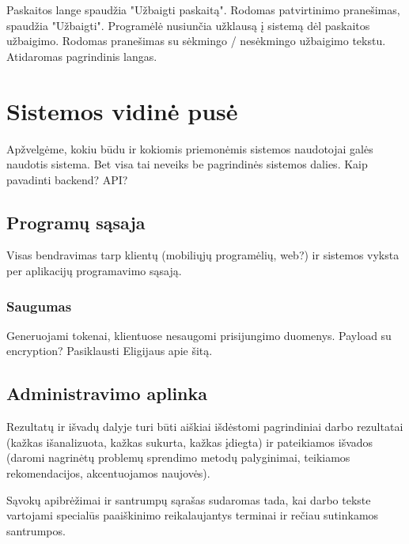 \documentclass{VUMIFPSkursinis}
\begin{document}
Paskaitos lange spaudžia "Užbaigti paskaitą". Rodomas patvirtinimo pranešimas, spaudžia "Užbaigti". Programėlė nusiunčia užklausą į sistemą dėl paskaitos užbaigimo. Rodomas pranešimas su sėkmingo / nesėkmingo užbaigimo tekstu. Atidaromas pagrindinis langas.

\section{Sistemos vidinė pusė}

Apžvelgėme, kokiu būdu ir kokiomis priemonėmis sistemos naudotojai galės naudotis sistema. Bet visa tai neveiks be pagrindinės sistemos dalies. Kaip pavadinti backend? API?

\subsection{Programų sąsaja}

Visas bendravimas tarp klientų (mobiliųjų programėlių, web?) ir sistemos vyksta per aplikacijų programavimo sąsają.

\subsubsection{Saugumas}

Generuojami tokenai, klientuose nesaugomi prisijungimo duomenys. Payload su encryption? Pasiklausti Eligijaus apie šitą.

\subsection{Administravimo aplinka}



Rezultatų ir išvadų dalyje turi būti aiškiai išdėstomi pagrindiniai darbo
rezultatai (kažkas išanalizuota, kažkas sukurta, kažkas įdiegta) ir pateikiamos
išvados (daromi nagrinėtų problemų sprendimo metodų palyginimai, teikiamos
rekomendacijos, akcentuojamos naujovės).

\printbibliography[heading=bibintoc]  %

Sąvokų apibrėžimai ir santrumpų sąrašas sudaromas tada, kai darbo tekste
vartojami specialūs paaiškinimo reikalaujantys terminai ir rečiau sutinkamos
santrumpos.

\appendix  %
\end{document}
